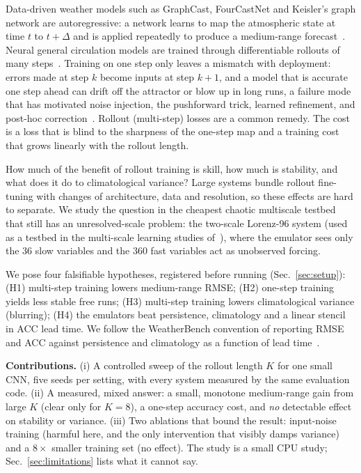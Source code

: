 Data-driven weather models such as GraphCast, FourCastNet and Keisler's graph network are autoregressive: a network learns to map the atmospheric state at time $t$ to $t+\Delta$ and is applied repeatedly to produce a medium-range forecast~\cite{lam2022graphcast,pathak2022fourcastnet,keisler2022forecasting}. Neural general circulation models are trained through differentiable rollouts of many steps~\cite{kochkov2023neural}. Training on one step only leaves a mismatch with deployment: errors made at step $k$ become inputs at step $k{+}1$, and a model that is accurate one step ahead can drift off the attractor or blow up in long runs, a failure mode that has motivated noise injection, the pushforward trick, learned refinement, and post-hoc correction~\cite{stachenfeld2021learned,brandstetter2022message,lippe2023pde,pedersen2025thermalizer}. Rollout (multi-step) losses are a common remedy. The cost is a loss that is blind to the sharpness of the one-step map and a training cost that grows linearly with the rollout length.

How much of the benefit of rollout training is skill, how much is stability, and what does it do to climatological variance? Large systems bundle rollout fine-tuning with changes of architecture, data and resolution, so these effects are hard to separate. We study the question in the cheapest chaotic multiscale testbed that still has an unresolved-scale problem: the two-scale Lorenz-96 system (used as a testbed in the multi-scale learning studies of~\cite{chattopadhyay2019data,gagne2019machine}), where the emulator sees only the $36$ slow variables and the $360$ fast variables act as unobserved forcing.

We pose four falsifiable hypotheses, registered before running (Sec.~\ref{sec:setup}): (H1) multi-step training lowers medium-range RMSE; (H2) one-step training yields less stable free runs; (H3) multi-step training lowers climatological variance (blurring); (H4) the emulators beat persistence, climatology and a linear stencil in ACC lead time. We follow the WeatherBench convention of reporting RMSE and ACC against persistence and climatology as a function of lead time~\cite{rasp2020weatherbench,rasp2023weatherbench}.

\textbf{Contributions.} (i) A controlled sweep of the rollout length $K$ for one small CNN, five seeds per setting, with every system measured by the same evaluation code. (ii) A measured, mixed answer: a small, monotone medium-range gain from large $K$ (clear only for $K{=}8$), a one-step accuracy cost, and \emph{no} detectable effect on stability or variance. (iii) Two ablations that bound the result: input-noise training (harmful here, and the only intervention that visibly damps variance) and a $8\times$ smaller training set (no effect). The study is a small CPU study; Sec.~\ref{sec:limitations} lists what it cannot say.
